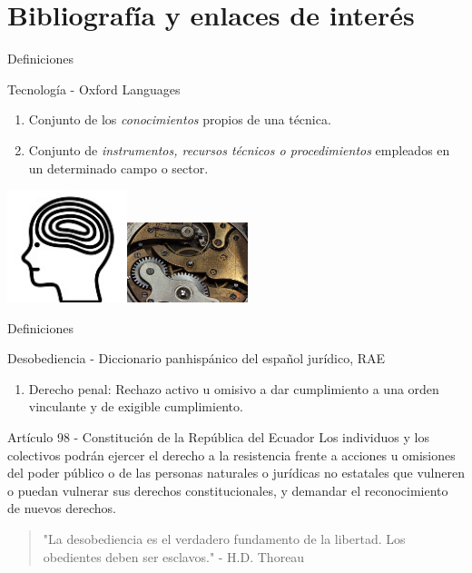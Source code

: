 \documentclass[spanish]{beamer}
\begin{document}
\section{Bibliografía y enlaces de interés}


\begin{frame}{Definiciones}
    \begin{block}{Tecnología - Oxford Languages}
        \begin{enumerate}
            \item Conjunto de los \emph{conocimientos} propios de una técnica.
            \item Conjunto de \emph{instrumentos, recursos técnicos o procedimientos} empleados en un determinado campo o sector.
        \end{enumerate}                             
    \end{block}
    \centering
    \includegraphics[width=3.5cm]{img/mind.jpg}\includegraphics[width=3.5cm]{img/clockwork.jpg}
\end{frame}
\begin{frame}{Definiciones}
    \begin{block}{Desobediencia - Diccionario panhispánico del español jurídico, RAE}
        \begin{enumerate}
            \item Derecho penal: Rechazo activo u omisivo a dar cumplimiento a una orden vinculante y de exigible cumplimiento.
        \end{enumerate}
    \end{block}
    \begin{block}{Artículo 98 - Constitución de la República del Ecuador}
        Los individuos y los colectivos podrán ejercer el derecho a la resistencia frente a acciones u omisiones del poder público o de las personas naturales o jurídicas no estatales que vulneren o puedan vulnerar sus derechos constitucionales, y demandar el reconocimiento de nuevos derechos.
    \end{block}
\end{frame}
\begin{frame}{}
    \begin{quote}
        "La desobediencia es el verdadero fundamento de la libertad. Los obedientes deben ser esclavos." - H.D. Thoreau
    \end{quote}
\end{frame}
\end{document}
